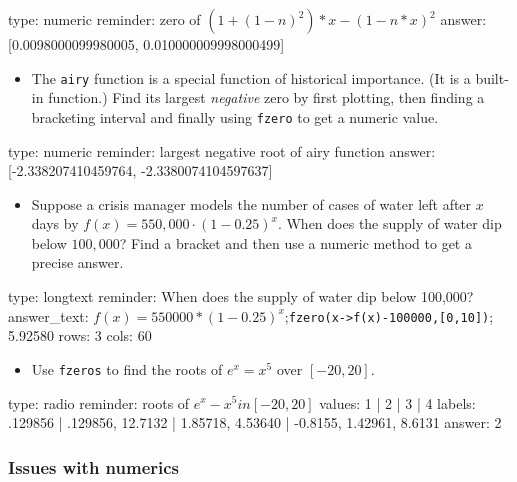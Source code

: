 \documentclass[12pt]{article}
\begin{document}
\begin{answer}
    type: numeric
    reminder: zero of  \( (1 + (1-n)^2)*x - (1-n*x)^2 \)
    answer: [0.0098000099980005, 0.010000009998000499]

\end{answer}

\begin{itemize}
\itemsep1pt\parskip0pt
\item
  The \texttt{airy} function is a special function of historical
  importance. (It is a built-in function.) Find its largest
  \emph{negative} zero by first plotting, then finding a bracketing
  interval and finally using \texttt{fzero} to get a numeric value.
\end{itemize}

\begin{answer}
    type: numeric
    reminder: largest negative root of airy function
    answer: [-2.338207410459764, -2.3380074104597637]

\end{answer}

\begin{itemize}
\itemsep1pt\parskip0pt
\item
  Suppose a crisis manager models the number of cases of water left
  after $x$ days by $f(x) = 550,000 \cdot (1 - 0.25)^x$. When does the
  supply of water dip below $100,000$? Find a bracket and then use a
  numeric method to get a precise answer.
\end{itemize}

\begin{answer}
type: longtext
reminder: When does the supply of water dip below 100,000?
answer_text: \(f(x) = 550000*(1-0.25)^x\);\verb+fzero(x->f(x)-100000,[0,10])+; 5.92580 
rows: 3
cols: 60
\end{answer}

\begin{itemize}
\itemsep1pt\parskip0pt
\item
  Use \texttt{fzeros} to find the roots of $e^x = x^5$ over $[-20,20]$.
\end{itemize}

\begin{answer}
type: radio
reminder: roots of \( e^x - x^5 in [-20,20] \)
values: 1 | 2 | 3 | 4
labels: .129856 | .129856, 12.7132 | 1.85718, 4.53640 | -0.8155, 1.42961, 8.6131
answer: 2
\end{answer}

\subsubsection{Issues with numerics}
\end{document}
